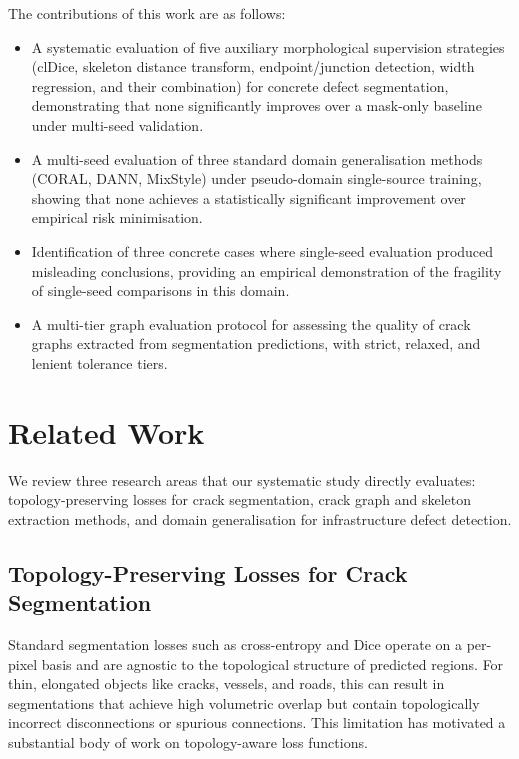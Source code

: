 \documentclass[preprint,12pt]{elsarticle}
\begin{document}
The contributions of this work are as follows:
\begin{itemize}
    \item A systematic evaluation of five auxiliary morphological supervision strategies (clDice, skeleton distance transform, endpoint/junction detection, width regression, and their combination) for concrete defect segmentation, demonstrating that none significantly improves over a mask-only baseline under multi-seed validation.
    \item A multi-seed evaluation of three standard domain generalisation methods (CORAL, DANN, MixStyle) under pseudo-domain single-source training, showing that none achieves a statistically significant improvement over empirical risk minimisation.
    \item Identification of three concrete cases where single-seed evaluation produced misleading conclusions, providing an empirical demonstration of the fragility of single-seed comparisons in this domain.
    \item A multi-tier graph evaluation protocol for assessing the quality of crack graphs extracted from segmentation predictions, with strict, relaxed, and lenient tolerance tiers.
\end{itemize}



\section{Related Work}
\label{sec:related_work}

We review three research areas that our systematic study directly evaluates: topology-preserving losses for crack segmentation, crack graph and skeleton extraction methods, and domain generalisation for infrastructure defect detection.

\subsection{Topology-Preserving Losses for Crack Segmentation}
\label{sec:rw_topology}

Standard segmentation losses such as cross-entropy and Dice operate on a per-pixel basis and are agnostic to the topological structure of predicted regions. For thin, elongated objects like cracks, vessels, and roads, this can result in segmentations that achieve high volumetric overlap but contain topologically incorrect disconnections or spurious connections. This limitation has motivated a substantial body of work on topology-aware loss functions.
\end{document}
